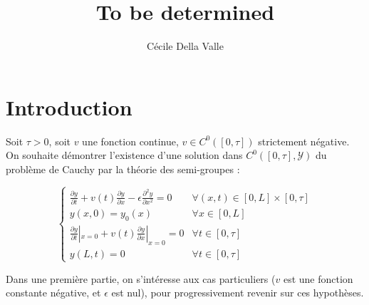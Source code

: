 \documentclass[a4paper]{article}
\title{To be determined}
\author{Cécile Della Valle}
\begin{document}
\maketitle

\section{Introduction}

Soit $\tau>0$,
soit $v$ une fonction continue, $v \in C^0([0,\tau])$ strictement négative.
On souhaite démontrer l'existence d'une solution dans $C^0([0,\tau],\mathscr{Y})$ du problème de Cauchy par la théorie des semi-groupes :

\begin{equation}
\label{eq:general}
\begin{cases}
 \displaystyle \frac{\partial y}{\partial t}
 + v(t) \frac{\partial y} {\partial x}  
 - \epsilon \frac{\partial^2 y} {\partial x^2}
 = 0  & \forall (x,t) \in [0,L] \times [0, \tau]\\
 y(x,0) = y_{0} (x) & \forall x \in [0,L] \\
 \displaystyle \frac{\partial y}{\partial t}|_{x=0}
 + v(t) \frac{\partial y} {\partial x}|_{x=0} = 0 & \forall t \in [0,\tau]\\
 y(L,t) = 0 & \forall t \in [0,\tau]
\end{cases}
\end{equation}

Dans une première partie, on s'intéresse aux cas particuliers ($v$ est une fonction constante négative, et $\epsilon$ est nul), 
pour progressivement revenir sur ces hypothèses.
\end{document}

